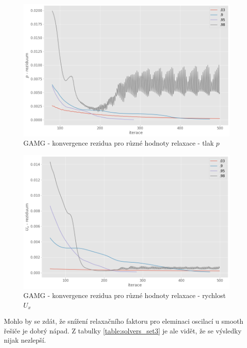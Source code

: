 \documentclass[a4paper,12pt]{report}
\theoremstyle{remark}
\begin{document}
\begin{figure}[H]
	\centering
	\includegraphics[width=1\linewidth]{p-under-relax.png}
	\caption{GAMG - konvergence rezidua pro různé hodnoty relaxace - tlak $p$}
	\label{fig:p-residuum-relax}
\end{figure}

\begin{figure}[H]
	\centering
	\includegraphics[width=1\linewidth]{ux-under-relax.png}
	\caption{GAMG - konvergence rezidua pro různé hodnoty relaxace - rychlost $U_x$}
	\label{fig:ux-residuum-relax}
\end{figure}

Mohlo by se zdát, že snížení relaxačního faktoru pro eleminaci oscilací u smooth řešiče je dobrý nápad. Z tabulky \ref{table:solvers_set3}  je ale vidět, že se výsledky nijak nezlepší.
\end{document}
